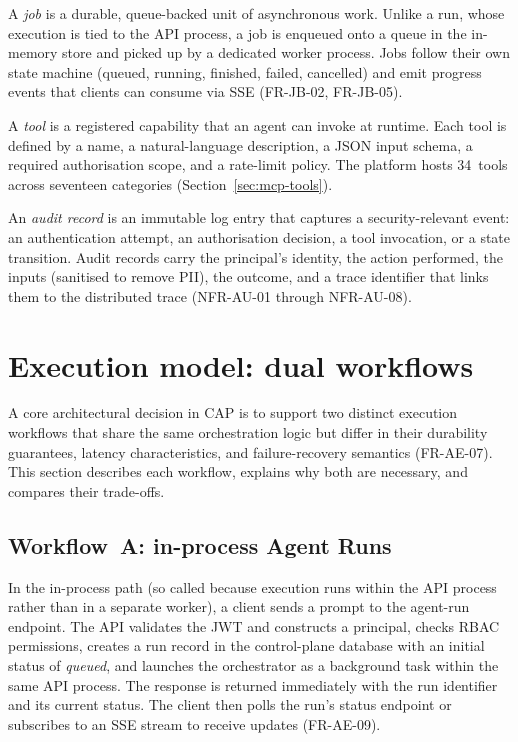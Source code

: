 \documentclass[a4paper]{sapthesis}
\begin{document}
A \emph{job} is a durable, queue-backed unit of asynchronous work.  Unlike
a run, whose execution is tied to the API process, a job is enqueued onto
a queue in the in-memory store and picked up by a dedicated worker process.  Jobs follow
their own state machine (queued, running, finished, failed, cancelled) and
emit progress events that clients can consume via SSE (FR-JB-02, FR-JB-05).

A \emph{tool} is a registered capability that an agent can invoke at
runtime.  Each tool is defined by a name, a natural-language description, a
JSON input schema, a required authorisation scope, and a rate-limit policy.
The platform hosts 34~tools across seventeen categories
(Section~\ref{sec:mcp-tools}).

An \emph{audit record} is an immutable log entry that captures a
security-relevant event: an authentication attempt, an authorisation
decision, a tool invocation, or a state transition.  Audit records carry
the principal's identity, the action performed, the inputs (sanitised to
remove PII), the outcome, and a trace identifier that links them to the
distributed trace (NFR-AU-01 through NFR-AU-08).


\section{Execution model: dual workflows}
\label{sec:execution-model}

A core architectural decision in CAP is to support two distinct execution
workflows that share the same orchestration logic but differ in their
durability guarantees, latency characteristics, and failure-recovery
semantics (FR-AE-07).  This section describes each workflow, explains why
both are necessary, and compares their trade-offs.

\subsection{Workflow~A: in-process Agent Runs}

In the in-process path (so called because execution runs within the API
process rather than in a separate worker), a client sends a prompt to
the agent-run endpoint.
The API validates the JWT and constructs a principal, checks RBAC
permissions, creates a run record in the control-plane database with an
initial status of \emph{queued}, and launches the orchestrator as a
background task within the same API process.  The response is returned
immediately with the run identifier and its current status.
The client then polls the run's status endpoint or
subscribes to an SSE stream to receive updates (FR-AE-09).
\end{document}
